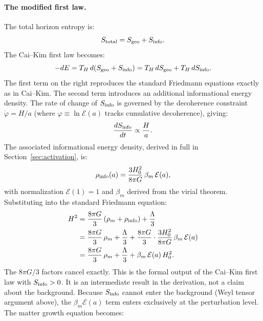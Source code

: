 \documentclass[12pt,a4paper]{article}
\begin{document}
\paragraph{The modified first law.}
The total horizon entropy is:
\begin{equation}
S_{\rm total} = S_{\rm geo} + S_{\rm info}.
\label{eq:Stotal}
\end{equation}
The Cai--Kim first law becomes:
\begin{equation}
-dE = T_H\,d(S_{\rm geo} + S_{\rm info})
= T_H\,dS_{\rm geo} + T_H\,dS_{\rm info}.
\label{eq:modified_first_law}
\end{equation}
The first term on the right reproduces the standard Friedmann equations exactly
as in Cai--Kim. The second term introduces an additional informational energy
density. The rate of change of $S_{\rm info}$ is governed by the decoherence
constraint $\dot\varphi = H/a$ (where $\varphi \equiv \ln\mathcal{E}(a)$
tracks cumulative decoherence), giving:
\begin{equation}
\frac{dS_{\rm info}}{dt} \propto \frac{H}{a}.
\end{equation}
The associated informational energy density, derived in full in Section~\ref{sec:activation},
is:
\begin{equation}
\rho_{\rm info}(a) = \frac{3H_0^2}{8\pi G}\,\beta_m\,\mathcal{E}(a),
\label{eq:rho_info}
\end{equation}
with normalization $\mathcal{E}(1) = 1$ and $\beta_m$ derived from the virial
theorem. Substituting into the standard Friedmann equation:
\begin{align}
H^2 &= \frac{8\pi G}{3}\,(\rho_m + \rho_{\rm info}) + \frac{\Lambda}{3}
\notag\\
&= \frac{8\pi G}{3}\,\rho_m + \frac{\Lambda}{3}
+ \frac{8\pi G}{3}\cdot\frac{3H_0^2}{8\pi G}\,\beta_m\,\mathcal{E}(a)
\notag\\
&= \frac{8\pi G}{3}\,\rho_m + \frac{\Lambda}{3}
+ \beta_m\,\mathcal{E}(a)\,H_0^2.
\label{eq:friedmann_iam_formal}
\end{align}
The $8\pi G/3$ factors cancel exactly. This is the formal output of the
Cai--Kim first law with $S_{\rm info} > 0$. It is an intermediate result
in the derivation, not a claim about the background. Because $S_{\rm info}$
cannot enter the background (Weyl tensor argument above), the $\beta_m\mathcal{E}(a)$
term enters exclusively at the perturbation level. The matter growth equation becomes:
\end{document}

